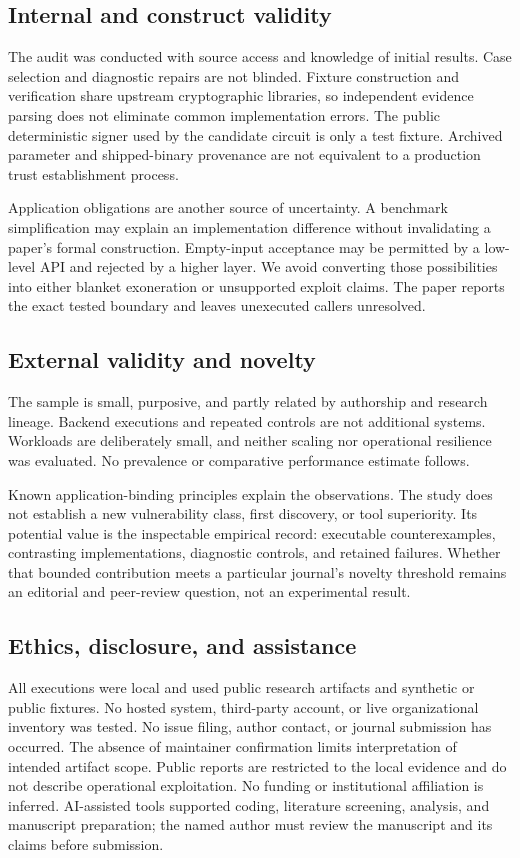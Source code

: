 \documentclass[sigconf,nonacm]{acmart}
\begin{document}
\subsection{Internal and construct validity}
The audit was conducted with source access and knowledge of initial results. Case selection and diagnostic repairs are not blinded. Fixture construction and verification share upstream cryptographic libraries, so independent evidence parsing does not eliminate common implementation errors. The public deterministic signer used by the candidate circuit is only a test fixture. Archived parameter and shipped-binary provenance are not equivalent to a production trust establishment process.

Application obligations are another source of uncertainty. A benchmark simplification may explain an implementation difference without invalidating a paper's formal construction. Empty-input acceptance may be permitted by a low-level API and rejected by a higher layer. We avoid converting those possibilities into either blanket exoneration or unsupported exploit claims. The paper reports the exact tested boundary and leaves unexecuted callers unresolved.

\subsection{External validity and novelty}
The sample is small, purposive, and partly related by authorship and research lineage. Backend executions and repeated controls are not additional systems. Workloads are deliberately small, and neither scaling nor operational resilience was evaluated. No prevalence or comparative performance estimate follows.

Known application-binding principles explain the observations. The study does not establish a new vulnerability class, first discovery, or tool superiority. Its potential value is the inspectable empirical record: executable counterexamples, contrasting implementations, diagnostic controls, and retained failures. Whether that bounded contribution meets a particular journal's novelty threshold remains an editorial and peer-review question, not an experimental result.

\subsection{Ethics, disclosure, and assistance}
All executions were local and used public research artifacts and synthetic or public fixtures. No hosted system, third-party account, or live organizational inventory was tested. No issue filing, author contact, or journal submission has occurred. The absence of maintainer confirmation limits interpretation of intended artifact scope. Public reports are restricted to the local evidence and do not describe operational exploitation. No funding or institutional affiliation is inferred. AI-assisted tools supported coding, literature screening, analysis, and manuscript preparation; the named author must review the manuscript and its claims before submission.
\end{document}
